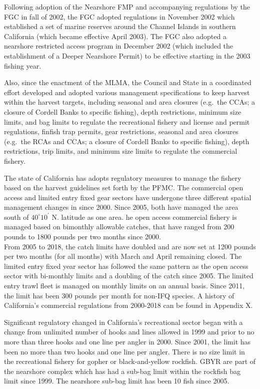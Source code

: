 \documentclass[12pt,]{article}
\begin{document}
Following adoption of the Nearshore FMP and accompanying regulations by
the FGC in fall of 2002, the FGC adopted regulations in November 2002
which established a set of marine reserves around the Channel Islands in
southern California (which became effective April 2003). The FGC also
adopted a nearshore restricted access program in December 2002 (which
included the establishment of a Deeper Nearshore Permit) to be effective
starting in the 2003 fishing year.

Also, since the enactment of the MLMA, the Council and State in a
coordinated effort developed and adopted various management
specifications to keep harvest within the harvest targets, including
seasonal and area closures (e.g.~the CCAs; a closure of Cordell Banks to
specific fishing), depth restrictions, minimum size limits, and bag
limits to regulate the recreational fishery and license and permit
regulations, finfish trap permits, gear restrictions, seasonal and area
closures (e.g.~the RCAs and CCAs; a closure of Cordell Banks to specific
fishing), depth restrictions, trip limits, and minimum size limits to
regulate the commercial fishery.

The state of California has adopts regulatory measures to manage the
fishery based on the harvest guidelines set forth by the PFMC. The
commercial open access and limited entry fixed gear sectors have
undergone three different spatial management changes in since 2000.
Since 2005, both have managed the area south of \(40^\circ 10^\prime\)
N. latitude as one area. he open access commercial fishery is managed
based on bimonthly allowable catches, that have ranged from 200 pounds
to 1800 pounds per two months since 2000.\\
From 2005 to 2018, the catch limits have doubled and are now set at 1200
pounds per two months (for all months) with March and April remaining
closed. The limited entry fixed year sector has followed the same
pattern as the open access sector with bi-monthly limits and a doubling
of the catch since 2005. The limited entry trawl fleet is managed on
monthly limits on an annual basis. Since 2011, the limit has been 300
pounds per month for non-IFQ species. A history of California's
commercial regulations from 2000-2018 can be found in Appendix X.

Significant regulatory changed in California's recreational sector began
with a change from unlimited number of hooks and lines allowed in 1999
and prior to no more than three hooks and one line per angler in 2000.
Since 2001, the limit has been no more than two hooks and one line per
angler. There is no size limit in the recreational fishery for gopher or
black-and-yellow rockfish. GBYR are part of the nearshore complex which
has had a sub-bag limit within the rockfish bag limit since 1999. The
nearshore sub-bag limit has been 10 fish since 2005.
\end{document}
